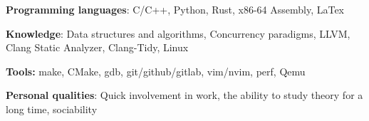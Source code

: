 \textbf{Programming languages}: C/C++, Python, Rust, x86-64 Assembly, LaTex

\textbf{Knowledge}: Data structures and algorithms, Concurrency paradigms, LLVM, Clang Static Analyzer, Clang-Tidy, Linux

\textbf{Tools:} make, CMake, gdb, git/github/gitlab, vim/nvim, perf, Qemu

\textbf{Personal qualities}: Quick involvement in work, the ability to study theory for a long time, sociability